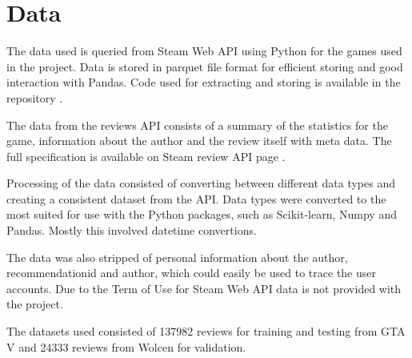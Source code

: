 \chapter{Data}
\label{cha:data}

The data used is queried from Steam Web API \cite{steamworks} using Python for the games used in the project. 
Data is stored in parquet file format \cite{apacheparquet} for efficient storing and good interaction with Pandas.
Code used for extracting and storing is available in the repository \cite{repostitory}.

The data from the reviews API consists of a summary of the statistics for the game, information about the author and the review itself with meta data. 
The full specification is available on Steam review API page \cite{steamworks}.

Processing of the data consisted of converting between different data types and creating a consistent dataset from the API. 
Data types were converted to the most suited for use with the Python packages, such as Scikit-learn, Numpy and Pandas.
Mostly this involved datetime convertions.

The data was also stripped of personal information about the author, recommendationid and author, which could easily be used to trace the user accounts.
Due to the Term of Use for Steam Web API \cite{steamapi} data is not provided with the project.

The datasets used consisted of 137982 reviews for training and testing from GTA V and 24333 reviews from Wolcen for validation. 
